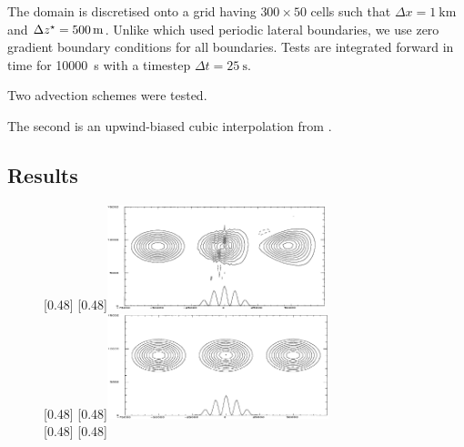 The domain is discretised onto a grid having $300 \times 50$ cells such that $\Delta x = \SI{1}{\kilo\meter}$ and $\Delta {z^\star} = \SI{500}{\meter}$.  Unlike \textcite{schaer2002} which used periodic lateral boundaries, we use zero gradient boundary conditions for all boundaries.
Tests are integrated forward in time for \SI{10000}{\second} with a timestep $\Delta t = \SI{25}{\second}$.  


Two advection schemes were tested.

The second is an upwind-biased cubic interpolation from \cite{weller2009}.  

\subsection{Results}
\begin{figure}
	\captionsetup[subfigure]{position=b}
	\centering
	[0.48\textwidth]{}
	\hfill
	[0.48\textwidth]{\vspace{0.43in}\includegraphics[height=1.2in]{img/schaer-btf-centred.png}}
\\
	[0.48\textwidth]{}
	\hfill
	[0.48\textwidth]{\vspace{0.43in}\includegraphics[height=1.2in]{img/schaer-sleve-centred.png}}
\\
	[0.48\textwidth]{}
	\hfill
	[0.48\textwidth]{\TODO{}}
%
	\caption{}
	\label{fig:advection:vanLeer}
\end{figure}

